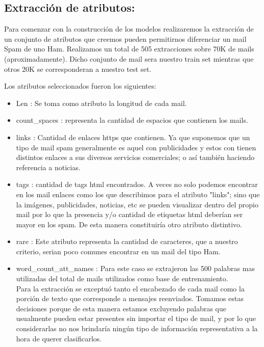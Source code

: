 \documentclass[a4paper]{article}
\begin{document}
\subsection{Extracción de atributos:}

Para comenzar con la construcción de los modelos realizaremos la extracción de un conjunto de atributos que creemos pueden permitirnos diferenciar un mail Spam de uno Ham. Realizamos un total de 505 extracciones sobre 70K de mails (aproximadamente). Dicho conjunto de mail sera nuestro train set mientras que otros 20K se corresponderan a nuestro test set.

Los atributos seleccionados fueron los siguientes:
\begin{itemize}
\item Len : Se toma como atributo la longitud de cada mail.
\item count\_spaces : representa la cantidad de espacios que contienen los mails.
\item links : Cantidad de enlaces https que contienen. Ya que suponemos que un tipo de mail spam generalmente es aquel con publicidades y estos con tienen distintos enlaces a sus diversos servicios comerciales; o así también haciendo referencia a  noticias.
\item tags : cantidad de tags html encontrados. A veces no solo podemos encontrar en los mail enlaces como los que describimos para el atributo "links"; sino que la imágenes, publicidades, noticias, etc se pueden visualizar dentro del propio mail por lo que la presencia y/o cantidad de etiquetas html deberían ser mayor en los spam. De esta manera constituiría otro atributo distintivo. 
\item rare : Este atributo representa la cantidad de caracteres, que a nuestro criterio, serian poco comunes encontrar en un mail del tipo Ham.
\item word\_count\_att\_names : Para este caso se extrajeron las 500 palabras mas utilizadas del total de mails utilizados como base de entrenamiento. \\
Para la extracción se exceptuó tanto el encabezado de cada mail como la porción de texto que corresponde a mensajes reenviados. Tomamos estas decisiones porque de esta manera estamos excluyendo palabras que usualmente pueden estar presentes sin importar el tipo de mail, y por lo que considerarlas no nos brindaría ningún tipo de información representativa a la hora de querer clasificarlos.   
  

\end{itemize}
\end{document}
